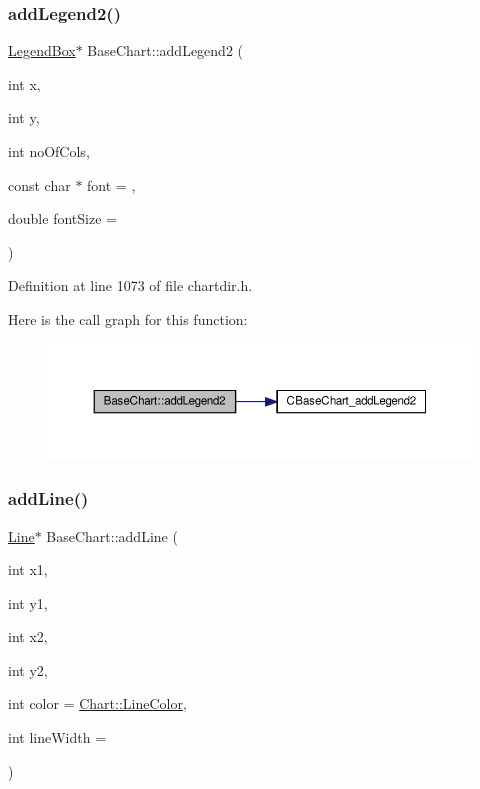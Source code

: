 \subsubsection{\texorpdfstring{add\+Legend2()}{addLegend2()}}
{\footnotesize\ttfamily \hyperlink{class_legend_box}{Legend\+Box}$\ast$ Base\+Chart\+::add\+Legend2 (\begin{DoxyParamCaption}\item[{int}]{x,  }\item[{int}]{y,  }\item[{int}]{no\+Of\+Cols,  }\item[{const char $\ast$}]{font = {},  }\item[{double}]{font\+Size = {} }\end{DoxyParamCaption})\hspace{0.3cm}{\ttfamily [inline]}}



Definition at line 1073 of file chartdir.\+h.

Here is the call graph for this function\+:
\nopagebreak
\begin{figure}[H]
\begin{center}
\leavevmode
\includegraphics[width=350pt]{class_base_chart_a2f48c68e5336176aae4922db13b12f9b_cgraph}
\end{center}
\end{figure}
\mbox{\label{class_base_chart_aef7dd1cbac801d351327e917de4130c7}} 
\subsubsection{\texorpdfstring{add\+Line()}{addLine()}}
{\footnotesize\ttfamily \hyperlink{class_line}{Line}$\ast$ Base\+Chart\+::add\+Line (\begin{DoxyParamCaption}\item[{int}]{x1,  }\item[{int}]{y1,  }\item[{int}]{x2,  }\item[{int}]{y2,  }\item[{int}]{color = {\ttfamily \hyperlink{namespace_chart_abee0d882fdc9ad0b001245ad9fc64011a04817a359476e87a5c572a7a69cdaaec}{Chart\+::\+Line\+Color}},  }\item[{int}]{line\+Width = {} }\end{DoxyParamCaption})\hspace{0.3cm}{\ttfamily [inline]}}



